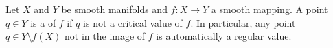 Let $X$ and $Y$ be smooth manifolds and $f: X \to Y$ a smooth mapping. A point $q \in Y$ is a  of $f$ if $q$ is not a critical value of $f$. In particular, any point $q \in Y \setminus f(X)$ not in the image of $f$ is automatically a regular value.
